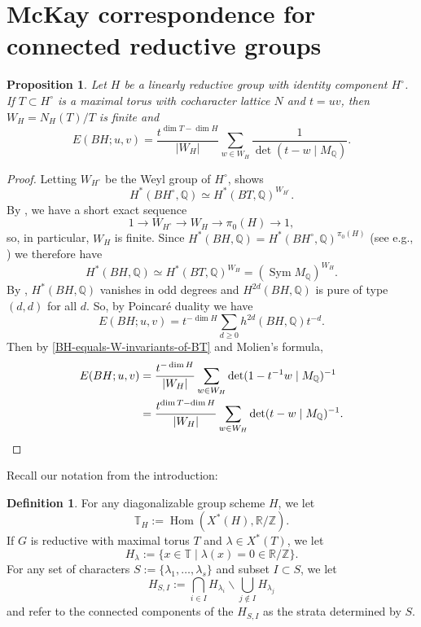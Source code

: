 \documentclass[12pt,a4paper]{amsart}
\newtheorem{proposition}[proposition]{Proposition}
\theoremstyle{definition}
\newtheorem{definition}[definition]{Definition}
\renewcommand{\setminus}{\smallsetminus}
\newcommand{\TT}{\mathbb T}
\newcommand{\ZZ}{\mathbb{Z}}
\newcommand{\QQ}{\mathbb{Q}}
\newcommand{\RR}{\mathbb{R}}
\renewcommand{\1}{\textbf{1}}
\newcommand{\<}{\langle}
\renewcommand{\>}{\rangle}
\DeclareMathOperator{\Sym}{Sym}
\DeclareMathOperator{\Hom}{Hom}
\begin{document}
\section{McKay correspondence for connected reductive groups}





\begin{proposition}\label{prop:molien}
	Let $H$ be a linearly reductive group with identity component $H^\circ$. If $T\subset H^\circ$ is a maximal torus with cocharacter lattice $N$ and $t=uv$, then $W_H=N_H(T)/T$ is finite and 
	\[
		 E(BH;u,v)=\frac{t^{\dim T-\dim H}}{|W_H|}\sum_{w\in W_H}\frac{1}{\det(t-w\mid  M_\QQ)}.
	\]
\end{proposition}
\begin{proof}
	Letting $W_{H^\circ}$ be the Weyl group of $H^\circ$, \cite[6.1.6.1]{DeligneHodgeIII} shows
	\[
		H^*(BH^\circ,\QQ)\simeq H^*(BT,\QQ)^{W_{H^\circ}}.
	\]
	By \cite[Lemma 2.4]{Brion2015}, we have a short exact sequence
	\[
		1\to W_{H^\circ}\to W_H\to \pi_0(H)\to 1,
	\]
	so, in particular, $W_H$ is finite. Since $H^*(BH,\QQ)=H^*(BH^\circ,\QQ)^{\pi_0(H)}$ (see e.g., \cite[9.1.1]{DeligneHodgeIII}) we therefore have
	\begin{equation}\label{BH-equals-W-invariants-of-BT}
		H^*(BH,\QQ)\simeq H^*(BT,\QQ)^{W_H}=(\Sym M_\QQ)^{W_H}.
	\end{equation}
	By \cite[9.1.1]{DeligneHodgeIII}, $H^*(BH,\QQ)$ vanishes in odd degrees and $H^{2d}(BH,\QQ)$ is pure of type $(d,d)$ for all $d$. So, by Poincar\'e duality \cite[Paragraph after Definition 3.11]{Tubach2025} we have
	\[
		E(BH;u,v)=t^{-\dim H}\sum_{d\geq0} h^{2d}(BH,\QQ)t^{-d}.
	\]
	Then by \eqref{BH-equals-W-invariants-of-BT} and Molien's formula,
	\begin{align*}
		E(BH;u,v) &=\frac{t^{-\dim H}}{|W_H|}\sum_{w\in W_H}\det(1-t^{-1}w\mid M_\QQ)^{-1}\\
		&=\frac{t^{\dim T-\dim H}}{|W_H|}\sum_{w\in W_H}\det(t-w\mid M_\QQ)^{-1}.\qedhere
	\end{align*}
\end{proof}



Recall our notation from the introduction:

\begin{definition}\label{def:hyperplanes-h-fnc}
	For any diagonalizable group scheme $H$, we let
	\[
		\TT_H:=\Hom(X^*(H),\RR/\ZZ).
	\]
	If $G$ is reductive with maximal torus $T$ and $\lambda\in X^*(T)$, we let
	\[
		H_\lambda := \{x\in\TT\mid \lambda(x)=0\in\RR/\ZZ\}.
	\]
	For any set of characters $S:=\{\lambda_1,\dots,\lambda_s\}$ and subset $I\subset S$, we let
	\[
		H_{S,I}:=\bigcap_{i\in I}H_{\lambda_i}\setminus\bigcup_{j\notin I}H_{\lambda_j}
	\]
	and refer to the connected components of the $H_{S,I}$ as the strata determined by $S$.
\end{definition}
\end{document}
